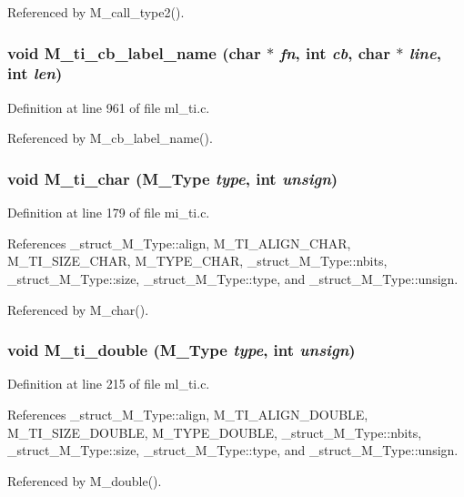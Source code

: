 Referenced by M\_\-call\_\-type2().
\subsubsection{\setlength{\rightskip}{0pt plus 5cm}void M\_\-ti\_\-cb\_\-label\_\-name (char $\ast$ {\em fn}, int {\em cb}, char $\ast$ {\em line}, int {\em len})}\label{m__ti_8h_9be118e933c4eac229cc67eca1a60c6a}




Definition at line 961 of file ml\_\-ti.c.

Referenced by M\_\-cb\_\-label\_\-name().
\subsubsection{\setlength{\rightskip}{0pt plus 5cm}void M\_\-ti\_\-char (\bf{M\_\-Type} {\em type}, int {\em unsign})}\label{m__ti_8h_95bff157bb3546a603e371e15e3f9daa}




Definition at line 179 of file mi\_\-ti.c.

References \_\-struct\_\-M\_\-Type::align, M\_\-TI\_\-ALIGN\_\-CHAR, M\_\-TI\_\-SIZE\_\-CHAR, M\_\-TYPE\_\-CHAR, \_\-struct\_\-M\_\-Type::nbits, \_\-struct\_\-M\_\-Type::size, \_\-struct\_\-M\_\-Type::type, and \_\-struct\_\-M\_\-Type::unsign.

Referenced by M\_\-char().
\subsubsection{\setlength{\rightskip}{0pt plus 5cm}void M\_\-ti\_\-double (\bf{M\_\-Type} {\em type}, int {\em unsign})}\label{m__ti_8h_2c690d4b5e43377e69836dc0c2f6b026}




Definition at line 215 of file ml\_\-ti.c.

References \_\-struct\_\-M\_\-Type::align, M\_\-TI\_\-ALIGN\_\-DOUBLE, M\_\-TI\_\-SIZE\_\-DOUBLE, M\_\-TYPE\_\-DOUBLE, \_\-struct\_\-M\_\-Type::nbits, \_\-struct\_\-M\_\-Type::size, \_\-struct\_\-M\_\-Type::type, and \_\-struct\_\-M\_\-Type::unsign.

Referenced by M\_\-double().
